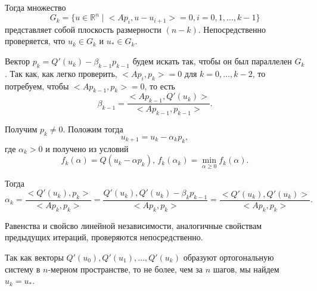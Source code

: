 Тогда множество 
\begin{equation*}
	G_k = \{u \in \mathbb{R}^n \mid \big<A p_i, u - u_{i + 1}\big> = 0, i = 0, 1, \dotsc, k - 1\}
\end{equation*}
представляет собой плоскость размерности $(n - k)$. Непосредственно проверяется, что $u_k \in G_k$ и $u_{\ast} \in G_k$.

Вектор $p_k = Q'(u_k) - \beta_{k - 1} p_{k - 1}$ будем искать так, чтобы он был параллелен $G_k$. Так как, как легко проверить, $\big<A p_i, p_k\big> = 0$ для $k = 0, \dotsc, k - 2$, то потребуем, чтобы $\big<A p_{k - 1}, p_k\big> = 0$, то есть 
\begin{equation*}
	\beta_{k - 1} = \frac{\big<A p_{k - 1}, Q'(u_k)\big>}{\big<A p_{k - 1}, p_{k - 1}\big>}.
\end{equation*}

Получим $p_k \not = 0$. Положим тогда 
\begin{equation*}
	u_{k + 1} = u_k - \alpha_k p_k,
\end{equation*}
где $\alpha_k > 0$ и получено из условий 
\begin{equation*}
	f_k(\alpha) = Q(u_k - \alpha p_k), \, f_k(\alpha_k) = \min_{\alpha \geqslant 0}{f_k(\alpha)}.
\end{equation*}

Тогда 
\begin{equation*}
	\alpha_k = \frac{\big<Q'(u_k), p_k\big>}{\big<A p_k, p_k\big>} = \frac{Q'(u_k), Q'(u_k) - \beta_k p_{k - 1}}{\big<A p_k, p_k\big>} = \frac{\big<Q'(u_k), Q'(u_k)\big>}{\big<A p_k, p_k\big>}. 
\end{equation*}

Равенства и свойсво линейной независимости, аналогичные свойствам предыдущих итераций, проверяются непосредственно.

Так как векторы $Q'(u_0), Q'(u_1), \dotsc, Q'(u_k)$ образуют ортогональную систему в $n$-мерном пространстве, то не более, чем за $n$ шагов, мы найдем $u_k = u_{\ast}$.